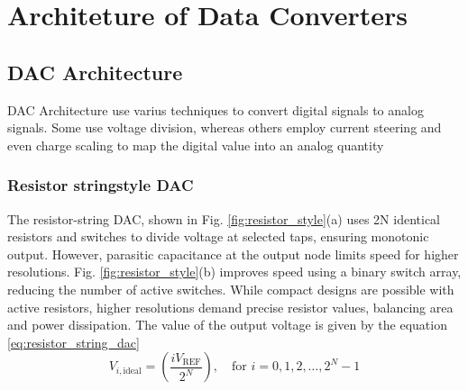 \chapter{Architeture of Data Converters}
\label{chapter:architecture}
\section{DAC Architecture}
\label{sec:dac_architecture}
DAC Architecture use varius techniques to convert digital signals to analog signals.
Some use voltage division, whereas others employ current
steering and even charge scaling to map the digital value into an analog quantity

\subsection{Resistor stringstyle DAC}
The resistor-string DAC, shown in Fig. \ref{fig:resistor_style}(a) uses 2N identical resistors and switches to divide voltage at selected taps, ensuring monotonic output. However, parasitic capacitance at the output node limits speed for higher resolutions. Fig. \ref{fig:resistor_style}(b) improves speed using a binary switch array, reducing the number of active switches. While compact designs are possible with active resistors, higher resolutions demand precise resistor values, balancing area and power dissipation.
The value of the output voltage is given by the equation \ref{eq:resistor_string_dac}
\begin{equation}
\label{eq:resistor_string_dac}
	V_{i,\text{ideal}} = \left( \frac{i V_{\text{REF}}}{2^N} \right), \quad \text{for } i = 0, 1, 2, \ldots, 2^N - 1
\end{equation}


